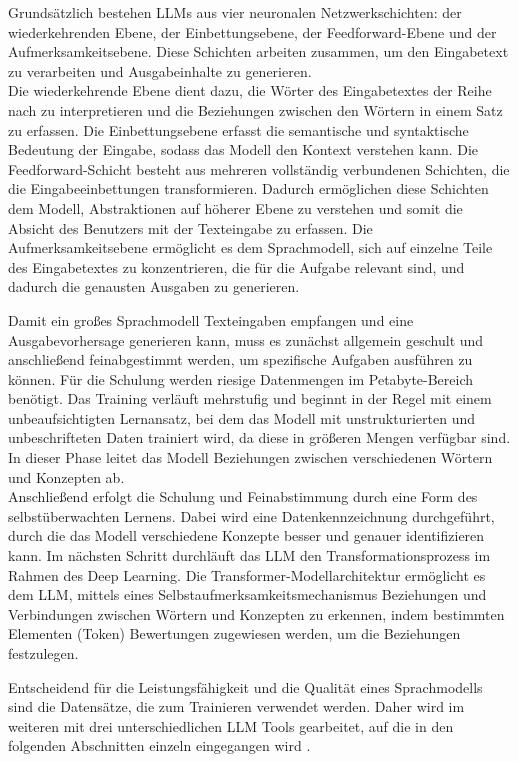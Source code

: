 Grundsätzlich bestehen LLMs aus vier neuronalen Netzwerkschichten: der wiederkehrenden Ebene, der Einbettungsebene, 
der Feedforward-Ebene und der Aufmerksamkeitsebene. Diese Schichten arbeiten zusammen, um den Eingabetext zu 
verarbeiten und Ausgabeinhalte zu generieren.\\
Die wiederkehrende Ebene dient dazu, die Wörter des Eingabetextes der Reihe nach zu interpretieren und die 
Beziehungen zwischen den Wörtern in einem Satz zu erfassen. Die Einbettungsebene erfasst die semantische und 
syntaktische Bedeutung der Eingabe, sodass das Modell den Kontext verstehen kann. Die Feedforward-Schicht besteht 
aus mehreren vollständig verbundenen Schichten, die die Eingabeeinbettungen transformieren. Dadurch ermöglichen 
diese Schichten dem Modell, Abstraktionen auf höherer Ebene zu verstehen und somit die Absicht des Benutzers mit 
der Texteingabe zu erfassen. Die Aufmerksamkeitsebene ermöglicht es dem Sprachmodell, sich auf einzelne Teile des 
Eingabetextes zu konzentrieren, die für die Aufgabe relevant sind, und dadurch die genausten Ausgaben zu generieren.

Damit ein großes Sprachmodell Texteingaben empfangen und eine Ausgabevorhersage generieren kann, muss es zunächst 
allgemein geschult und anschließend feinabgestimmt werden, um spezifische Aufgaben ausführen zu können. Für die 
Schulung werden riesige Datenmengen im Petabyte-Bereich benötigt. Das Training verläuft mehrstufig und beginnt 
in der Regel mit einem unbeaufsichtigten Lernansatz, bei dem das Modell mit unstrukturierten und unbeschrifteten 
Daten trainiert wird, da diese in größeren Mengen verfügbar sind. In dieser Phase leitet das Modell Beziehungen 
zwischen verschiedenen Wörtern und Konzepten ab.\\
Anschließend erfolgt die Schulung und Feinabstimmung durch eine Form des selbstüberwachten Lernens. Dabei wird 
eine Datenkennzeichnung durchgeführt, durch die das Modell verschiedene Konzepte besser und genauer identifizieren 
kann. Im nächsten Schritt durchläuft das LLM den Transformationsprozess im Rahmen des Deep Learning. Die 
Transformer-Modellarchitektur ermöglicht es dem LLM, mittels eines Selbstaufmerksamkeitsmechanismus Beziehungen 
und Verbindungen zwischen Wörtern und Konzepten zu erkennen, indem bestimmten Elementen (Token) Bewertungen 
zugewiesen werden, um die Beziehungen festzulegen.


Entscheidend für die Leistungsfähigkeit und die Qualität eines Sprachmodells sind die Datensätze, die zum 
Trainieren verwendet werden. Daher wird im weiteren mit drei unterschiedlichen LLM Tools gearbeitet, auf die 
in den folgenden Abschnitten einzeln eingegangen wird \cite{GrundlagenLLM}. 

